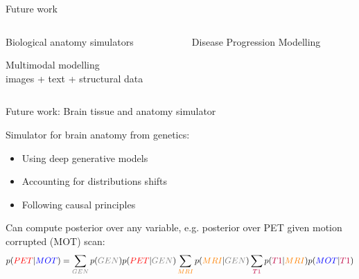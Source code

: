 \documentclass[8pt,xcolor=table,aspectratio=169]{beamer}
\begin{document}
\begin{frame}{Future work}


\vspace{-2em}
\begin{columns}
\begin{column}{0.5\textwidth}
\centering

Biological anatomy simulators\\

\vt
\vt

Multimodal modelling\\
images + text + structural data  

\end{column}
\begin{column}{0.5\textwidth}
\centering



Disease Progression Modelling



\end{column}
\end{columns}


\end{frame}


\newcommand{\tco}[1]{\textcolor{blue}{#1}}
\newcommand{\tct}[1]{\textcolor{red}{#1}}
\newcommand{\tcu}[1]{\textcolor{gray}{#1}}
\newcommand{\tcv}[1]{\textcolor{orange}{#1}}
\newcommand{\tcw}[1]{\textcolor{purple}{#1}}

\begin{frame}{Future work: Brain tissue and anatomy simulator}


Simulator for brain anatomy from genetics:
\begin{itemize}
 \item Using deep generative models
 \item Accounting for distributions shifts
 \item Following causal principles
\end{itemize}



 Can compute posterior over any variable, e.g. posterior over PET given motion corrupted (MOT) scan:
 $$ p(\tct{PET}|\tco{MOT}) = \sum_{\tcu{GEN}} p(\tcu{GEN}) p(\tct{PET}|\tcu{GEN}) \sum_{\tcv{MRI}} p(\tcv{MRI}|\tcu{GEN}) \sum_{\tcw{T1}} p(\tcw{T1} | \tcv{MRI}) p(\tco{MOT}|\tcw{T1}) $$

\end{frame}
\end{document}
